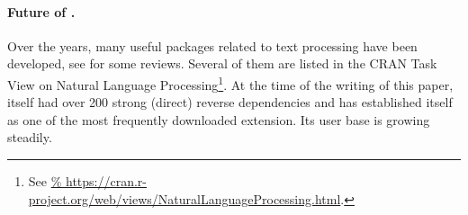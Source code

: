 \documentclass[nojss]{jss}
\begin{document}
%
%






\paragraph{Future of .}
Over the years, many useful  packages related
to text processing have been developed, see \citep{textminingr,textr}
for some reviews.
Several of them are listed in the CRAN Task View
on Natural Language Processing\footnote{
See \url{%
https://cran.r-project.org/web/views/NaturalLanguageProcessing.html}.
}.
At the time of the writing of this paper,
 itself had over 200 strong (direct) reverse dependencies
and has established itself as one of the most frequently downloaded
 extension. Its user base is growing steadily.
\end{document}
